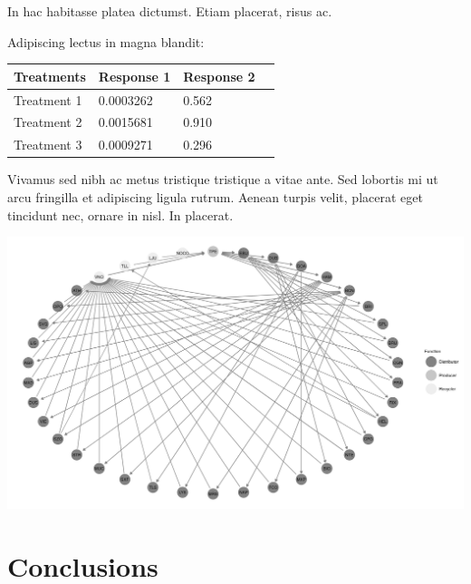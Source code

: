 \documentclass[a0,portrait]{a0poster}
\begin{document}
\begin{multicols}{2}
In hac habitasse platea dictumst. Etiam placerat, risus ac.

Adipiscing lectus in magna blandit:

\begin{center}\vspace{1cm}
\begin{tabular}{l l l l}
\toprule
\textbf{Treatments} & \textbf{Response 1} & \textbf{Response 2} \\
\midrule
Treatment 1 & 0.0003262 & 0.562 \\
Treatment 2 & 0.0015681 & 0.910 \\
Treatment 3 & 0.0009271 & 0.296 \\
\bottomrule
\end{tabular}
\end{center}\vspace{1cm}

Vivamus sed nibh ac metus tristique tristique a vitae ante. Sed lobortis mi ut arcu fringilla et adipiscing ligula rutrum. Aenean turpis velit, placerat eget tincidunt nec, ornare in nisl. In placerat.

\begin{center}\vspace{1cm}
\includegraphics[width=0.8\linewidth]{network.png}
\end{center}\vspace{1cm}


\color{SaddleBrown} %

\section*{Conclusions}


\end{multicols}
\end{document}
